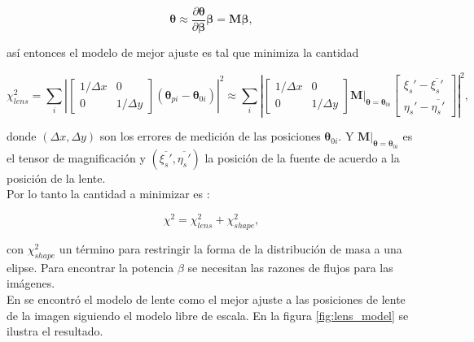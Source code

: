  

$$\bm{\theta} \approx \frac{\partial \bm{\theta}}{\partial \bm{\beta} } \bm{\beta} =  \bm{M} \bm{\beta},  $$

así entonces el modelo de mejor ajuste es tal que minimiza \cite{TR16} la cantidad

\[
\chi_{lens}^2 = \sum_{i} \left |
\begin{bmatrix}
    1/\Delta x & 0 \\
    0 & 1/\Delta y
\end{bmatrix}
\left ( \bm{\theta}_{pi} - \bm{\theta}_{0i} \right ) \right |^2 \approx \sum_{i} \left |
\begin{bmatrix}
    1/\Delta x & 0 \\
    0 & 1/\Delta y
\end{bmatrix}
 \bm{M}|_{\bm{\theta} = \bm{\theta}_{0i}} 
\begin{bmatrix}
    \xi_s' - \overline{\xi_s'} \\
    \eta_s' - \overline{\eta_s'}
\end{bmatrix}
 \right |^2 ,
\]

donde $(\Delta x, \Delta y)$ son los errores de medición de las posiciones $\bm{\theta}_{0i}$. Y $\bm{M}|_{\bm{\theta} = \bm{\theta}_{0i}}$ es el tensor de magnificación y $(\overline{\xi_s'}, \overline{\eta_s'})$ la posición de la fuente de acuerdo a la posición de la lente. \\

Por lo tanto la cantidad a minimizar es \cite{TR16}:

\begin{equation}
\chi^2 = \chi_{lens}^2 + \chi_{shape}^2,
\end{equation}

con $\chi_{shape}^2$ un término para restringir la forma de la distribución de masa a una elipse. Para encontrar la potencia $\beta$ se necesitan las razones de flujos para las imágenes.\\

En \cite{TR16} se encontró el modelo de lente como el mejor ajuste a las posiciones de lente de la imagen siguiendo el modelo libre de escala. En la figura \ref{fig:lens_model} se ilustra el resultado.

